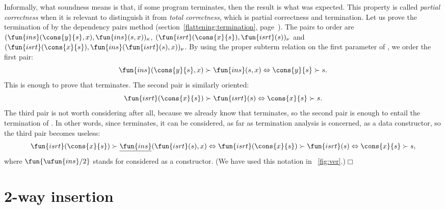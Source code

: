 
Informally, what soundness means is that, if some program terminates,
then the result is what was expected. This property is called
\emph{partial correctness} when it is relevant to distinguish it from
\emph{total correctness}, which is partial correctness and
termination. Let us prove the termination of  by the
dependency pairs method
(section~\ref{flattening:termination},
page~\pageref{flattening:termination}). The pairs to order are
\((\fun{ins}(\cons{y}{s},x), \fun{ins}(s,x))_\kappa\),
\((\fun{isrt}(\cons{x}{s}), \fun{isrt}(s))_\nu\) and
\((\fun{isrt}(\cons{x}{s}), \fun{ins}(\fun{isrt}(s), x))_\nu\). By
using the proper subterm
relation on the first parameter of ,
we order the first pair:
\begin{equation*}
\fun{ins}(\cons{y}{s},x) \succ \fun{ins}(s,x) \Leftrightarrow
\cons{y}{s} \succ s.
\end{equation*}
This is enough to prove that  terminates. The second pair
is similarly oriented:
\begin{equation*}
\fun{isrt}(\cons{x}{s}) \succ \fun{isrt}(s) \Leftrightarrow
\cons{x}{s} \succ s.
\end{equation*}
The third pair is not worth considering after all, because we already
know that  terminates, so the second pair is enough to
entail the termination of . In
other words, since  terminates, it can be considered, as
far as termination analysis is concerned, as a data constructor, so
the third pair becomes useless:
\begin{equation*}
\fun{isrt}(\cons{x}{s}) \succ \underline{\fun{ins}}(\fun{isrt}(s), x)
\Leftrightarrow \fun{isrt}(\cons{x}{s}) \succ \fun{isrt}(s)
\Leftrightarrow \cons{x}{s} \succ s,
\end{equation*}
where \(\fun{\ufun{ins}/2}\) stands for
 considered as a constructor. (We
have used this notation in \fig~\vref{fig:ver}.)\hfill\(\Box\)

\section{2-way insertion}
\label{sec:2-way}

